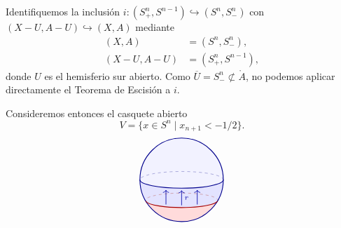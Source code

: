 \begin{dem}
Identifiquemos la inclusión $i \colon (S_+^n, S^{n-1}) \hookrightarrow (S^n, S_-^n)$ con $(X - U, A - U) \hookrightarrow (X, A)$ mediante
\begin{align*}
(X, A) &= (S^n, S_-^n), \\
(X - U, A - U) &= (S_+^n, S^{n-1}),
\end{align*}
donde $U$ es el hemisferio sur abierto. Como $\overline{U} = S_-^n \not\subset \mathring{A}$, no podemos aplicar directamente el Teorema de Escisión a $i$.

Consideremos entonces el casquete abierto
\[
V = \{x \in S^n \mid x_{n+1} < -1/2\}.
\]
\[
\begin{tikzpicture}[baseline=(current bounding box.center), scale=0.75]
    \begin{scope}
        \clip (0, 0) circle (2.0);
        \fill[blue!5] (0, 0) circle (2.0);
        \fill[blue!11]
            (-2.1, 0) -- (-2.0, 0)
            arc[start angle=180, end angle=360, x radius=2.0, y radius=0.40]
            -- (2.1, 0) -- (2.1, -2.2) -- (-2.1, -2.2) -- cycle;
        \fill[red!14]
            (-2.1, -1.0206) -- (-1.7200, -1.0206)
            arc[start angle=186.77, end angle=353.23, x radius=1.73205, y radius=0.34641]
            -- (2.1, -1.0206) -- (2.1, -2.2) -- (-2.1, -2.2) -- cycle;
    \end{scope}

    \draw[dashed, blue!55!black!55]
        (2.0, 0) arc[start angle=0, end angle=180, x radius=2.0, y radius=0.40];
    \draw[dashed, red!55!black!55]
        (1.7200, -1.0206) arc[start angle=-6.77, end angle=186.77, x radius=1.73205, y radius=0.34641];

    \draw[thick, blue!55!black] (0, 0) circle (2.0);
    \draw[thick, blue!55!black]
        (-2.0, 0) arc[start angle=180, end angle=360, x radius=2.0, y radius=0.40];
    \draw[thick, red!65!black]
        (-1.7200, -1.0206) arc[start angle=186.77, end angle=353.23, x radius=1.73205, y radius=0.34641];

    \draw[->, semithick, blue!65!black] (-0.75, -1.18) -- (-0.75, -0.48);
    \draw[->, semithick, blue!65!black] ( 0.00, -1.22) -- ( 0.00, -0.50);
    \draw[->, semithick, blue!65!black] ( 0.75, -1.18) -- ( 0.75, -0.48);
    \node[blue!65!black] at (0.24, -0.88) {\scriptsize $r$};


\end{tikzpicture}\]
\end{dem}
